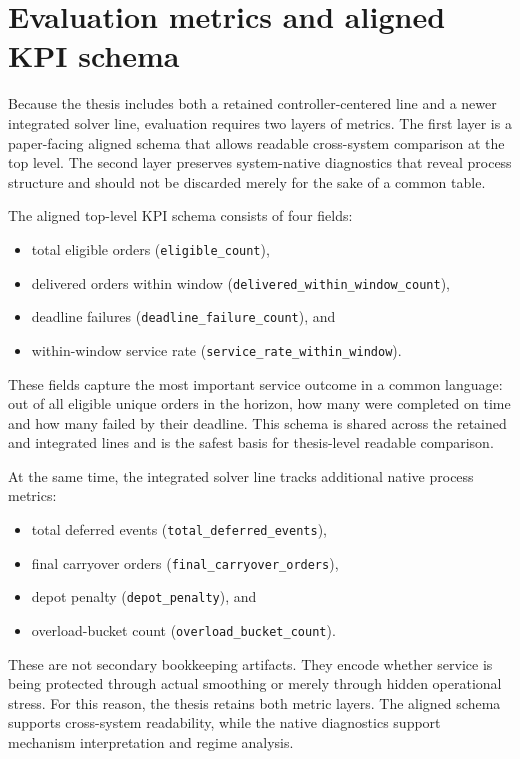 \section{Evaluation metrics and aligned KPI schema}

Because the thesis includes both a retained controller-centered line and a newer integrated solver line, evaluation requires two layers of metrics. The first layer is a paper-facing aligned schema that allows readable cross-system comparison at the top level. The second layer preserves system-native diagnostics that reveal process structure and should not be discarded merely for the sake of a common table.

The aligned top-level KPI schema consists of four fields:
\begin{itemize}
    \item total eligible orders (\texttt{eligible\_count}),
    \item delivered orders within window (\texttt{delivered\_within\_window\_count}),
    \item deadline failures (\texttt{deadline\_failure\_count}), and
    \item within-window service rate (\texttt{service\_rate\_within\_window}).
\end{itemize}
These fields capture the most important service outcome in a common language: out of all eligible unique orders in the horizon, how many were completed on time and how many failed by their deadline. This schema is shared across the retained and integrated lines and is the safest basis for thesis-level readable comparison.

At the same time, the integrated solver line tracks additional native process metrics:
\begin{itemize}
    \item total deferred events (\texttt{total\_deferred\_events}),
    \item final carryover orders (\texttt{final\_carryover\_orders}),
    \item depot penalty (\texttt{depot\_penalty}), and
    \item overload-bucket count (\texttt{overload\_bucket\_count}).
\end{itemize}
These are not secondary bookkeeping artifacts. They encode whether service is being protected through actual smoothing or merely through hidden operational stress. For this reason, the thesis retains both metric layers. The aligned schema supports cross-system readability, while the native diagnostics support mechanism interpretation and regime analysis.

